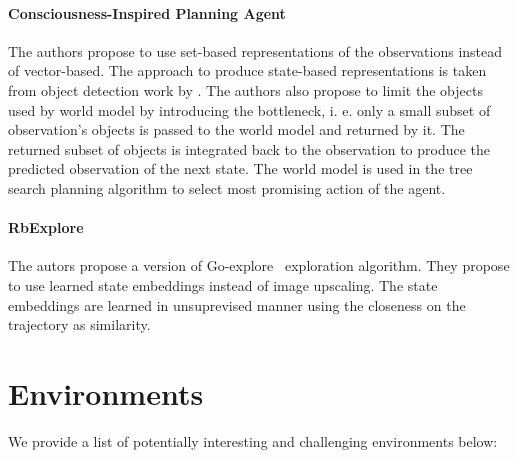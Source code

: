 \documentclass[acmsmall, nonacm]{acmart}
\begin{document}

\paragraph{Consciousness-Inspired Planning Agent \citet{Zhao2021ACP}}

The authors propose to use set-based representations of the observations instead of vector-based. The approach to produce state-based representations is taken from object detection work by \citet{Carion2020EndtoEndOD}. The authors also propose to limit the objects used by world model by introducing the bottleneck, i. e. only a small subset of observation's objects is passed to the world model and returned by it. The returned subset of objects is integrated back to the observation to produce the predicted observation of the next state. The world model is used in the tree search planning algorithm to select most promising action of the agent.


\paragraph{RbExplore \citet{Ugadiarov2021LongTermEI}}

The autors propose a version of Go-explore~\citet{ecoffet_first_2021} exploration algorithm. They propose to use learned state embeddings instead of image upscaling. The state embeddings are learned in unsuprevised manner using the closeness on the trajectory as similarity.


\section{Environments} %
\label{sec:environments}

We provide a list of potentially interesting and challenging environments below:
\end{document}
